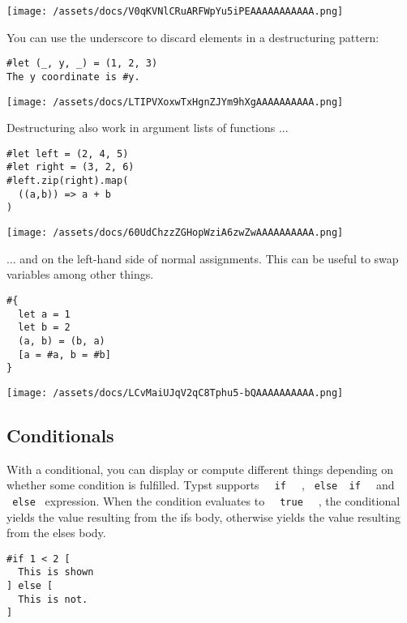 \texttt{[image: /assets/docs/V0qKVNlCRuARFWpYu5iPEAAAAAAAAAAA.png]}

You can use the underscore to discard elements in a destructuring
pattern:

\begin{verbatim}
#let (_, y, _) = (1, 2, 3)
The y coordinate is #y.
\end{verbatim}

\texttt{[image: /assets/docs/LTIPVXoxwTxHgnZJYm9hXgAAAAAAAAAA.png]}

Destructuring also work in argument lists of functions ...

\begin{verbatim}
#let left = (2, 4, 5)
#let right = (3, 2, 6)
#left.zip(right).map(
  ((a,b)) => a + b
)
\end{verbatim}

\texttt{[image: /assets/docs/60UdChzzZGHopWziA6zwZwAAAAAAAAAA.png]}

... and on the left-hand side of normal assignments. This can be useful
to swap variables among other things.

\begin{verbatim}
#{
  let a = 1
  let b = 2
  (a, b) = (b, a)
  [a = #a, b = #b]
}
\end{verbatim}

\texttt{[image: /assets/docs/LCvMaiUJqV2qC8Tphu5-bQAAAAAAAAAA.png]}

\subsection{Conditionals}\label{conditionals}

With a conditional, you can display or compute different things
depending on whether some condition is fulfilled. Typst supports
\texttt{\ }{\texttt{\ if\ }}\texttt{\ } ,
\texttt{\ else\ }{\texttt{\ if\ }}\texttt{\ } and \texttt{\ else\ }
expression. When the condition evaluates to
\texttt{\ }{\texttt{\ true\ }}\texttt{\ } , the conditional yields the
value resulting from the if\textquotesingle s body, otherwise yields the
value resulting from the else\textquotesingle s body.

\begin{verbatim}
#if 1 < 2 [
  This is shown
] else [
  This is not.
]
\end{verbatim}

